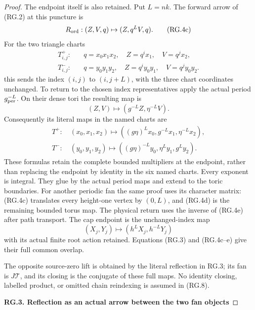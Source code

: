 \begin{proof}
The endpoint itself is also retained. Put \(L=nk\). The
forward arrow of (RG.2) at this puncture is
\[
             R_{\rm ord}:(Z,V,q)\mapsto(Z,q^LV,q).
                                                        \tag{RG.4c}
\]
For the two triangle charts
\[
 \begin{aligned}
 T^+_{i,j}:\quad &q=x_0x_1x_2,\quad Z=q^ix_1,\quad V=q^jx_2,\\
 T^-_{i,j}:\quad &q=y_0y_1y_2,\quad
 Z=q^iy_0y_1,\quad V=q^jy_0y_2.
 \end{aligned}
\]
this sends the index \((i,j)\) to \((i,j+L)\), with the
three chart coordinates unchanged. To return to the chosen
index representatives apply the actual period
\(g_{\rm per}^{-L}\). On their dense tori the resulting map is
\[
             (Z,V)\mapsto(g^{-L}Z,\eta^{-L}V).        \tag{RG.4d}
\]
Consequently its literal maps in the named charts are
\[
 \begin{split}
 T^+:\ &(x_0,x_1,x_2)\mapsto
       ((g\eta)^Lx_0,g^{-L}x_1,\eta^{-L}x_2),\\
 T^-:\ &(y_0,y_1,y_2)\mapsto
       ((g\eta)^{-L}y_0,\eta^Ly_1,g^Ly_2).
 \end{split}                                         \tag{RG.4e}
\]
These formulas retain the complete bounded multipliers at the
endpoint, rather than replacing the endpoint by identity in
the six named charts. Every exponent is integral. They glue
by the actual period maps and extend to the toric boundaries.
For another periodic fan the same proof uses its character
matrix: (RG.4c) translates every height-one vertex by
\((0,L)\), and (RG.4d) is the remaining bounded torus map.
The physical return uses the inverse of (RG.4e) after path
transport. The cap endpoint is the unchanged-index map
\[
       (X_j,Y_j)\mapsto(h^LX_j,h^{-L}Y_j)
\]
with its actual finite root action retained. Equations
(RG.3) and (RG.4c--e) give their full common overlap.

The opposite source-zero lift is obtained by the literal
reflection in RG.3; its fan is \(J\mathcal T\), and its
closing is the conjugate of these full maps. No identity
closing, labelled product, or omitted chain reindexing is
assumed in (RG.8).

\par

\medskip\noindent\textbf{RG.3. Reflection as an actual arrow between the two fan objects}

\par\nobreak


\end{proof}
